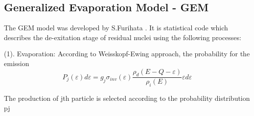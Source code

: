 \subsection{Generalized Evaporation Model - GEM}
The GEM model was developed by S.Furihata \cite{FURIHATA2000,Furihata2002}. It is statistical code which describes the de-exitation stage of residual nuclei using the following processes: \par
(1). Evaporation: According to Weisskopf-Ewing approach, the probability for the
emission
\begin{equation}
	P_j(\varepsilon)d\varepsilon = g_j \sigma_{inv}(\varepsilon)\frac{\rho_{d}\left(E-Q-\varepsilon\right)}{\rho_{i}\left(E\right)}\varepsilon d\varepsilon
\end{equation}

The production of jth particle is selected according to the probability distribution pj




